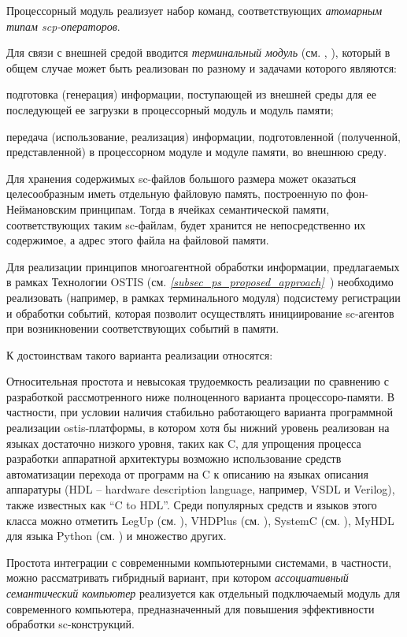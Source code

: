 \begin{textitemize}
	\item Процессорный модуль реализует набор команд, соответствующих \textit{атомарным типам scp-операторов}.
	\item Для связи с внешней средой вводится \textit{терминальный модуль} (см. , ), который в общем случае может быть реализован по разному и задачами которого являются:
	\begin{textitemize}
		\item подготовка (генерация) информации, поступающей из внешней среды для ее последующей ее загрузки в процессорный модуль и модуль памяти;
		\item передача (использование, реализация) информации, подготовленной (полученной, представленной) в процессорном модуле и модуле памяти, во внешнюю среду.
	\end{textitemize}
	\item Для хранения содержимых sc-файлов большого размера может оказаться целесообразным иметь отдельную файловую память, построенную по фон-Неймановским принципам. Тогда в ячейках семантической памяти, соответствующих таким sc-файлам, будет хранится не непосредственно их содержимое, а адрес этого файла на файловой памяти.
	\item Для реализации принципов многоагентной обработки информации, предлагаемых в рамках Технологии OSTIS (см. \textit{\ref{subsec_ps_proposed_approach}~}) необходимо реализовать (например, в рамках терминального модуля) подсистему регистрации и обработки событий, которая позволит осуществлять инициирование sc-агентов при возникновении соответствующих событий в памяти.
\end{textitemize}

К достоинствам такого варианта реализации относятся:
\begin{textitemize}
	\item Относительная простота и невысокая трудоемкость реализации по сравнению с разработкой рассмотренного ниже полноценного варианта процессоро-памяти. В частности, при условии наличия стабильно работающего варианта программной реализации ostis-платформы, в котором хотя бы нижний уровень реализован на языках достаточно низкого уровня, таких как C, для упрощения процесса разработки аппаратной архитектуры возможно использование средств автоматизации перехода от программ на C к описанию на языках описания аппаратуры (HDL -- hardware description language, например, VSDL и Verilog), также известных как ``C to HDL''. Среди популярных средств и языков этого класса можно отметить LegUp (см. ), VHDPlus (см. ), SystemC (см. ), MyHDL для языка Python (см. ) и множество других.
	\item Простота интеграции с современными компьютерными системами, в частности, можно рассматривать гибридный вариант, при котором \textit{ассоциативный семантический компьютер} реализуется как отдельный подключаемый модуль для современного компьютера, предназначенный для повышения эффективности обработки sc-конструкций.
\end{textitemize}

